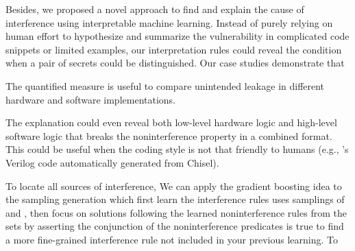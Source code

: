 Besides, we proposed a novel approach to find and explain the cause of
interference using interpretable machine learning. Instead of purely
relying on human effort to hypothesize and summarize the vulnerability
in complicated code snippets or limited examples, our interpretation
rules could reveal the condition when a pair of secrets
could be distinguished. Our case studies demonstrate that 
\begin{compactitem}
\item
The quantified measure \JaccardWithDeclass{\secretsSetSize} is useful
to compare unintended leakage in different hardware and software implementations.
\item The explanation could even reveal both low-level hardware logic
and high-level software logic that breaks the noninterference property
in a combined format. This could be useful when the coding style is not
that friendly to humans (e.g., \boom's Verilog code automatically
generated from Chisel). 
\end{compactitem}
To locate all sources of interference, We can apply the
gradient boosting idea to the sampling generation which first learn the
interference rules uses samplings of \noninterferenceSetSamples and
\interferenceSetSamples, then focus on solutions following the learned
noninterference rules from the sets by asserting the conjunction of the
noninterference predicates is true to find a more fine-grained
interference rule not included in your previous learning. To 
\fi
\fi

